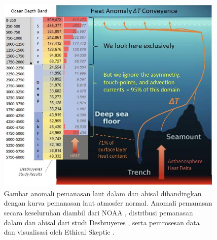 \documentclass[10pt,twocolumn,letterpaper]{article}
\begin{document}
\begin{figure}[t]
\begin{center}
\includegraphics[width=1\textwidth]{deepsea.jpg}
\end{center}
   \caption{Gambar anomali pemanasan laut dalam dan abisal dibandingkan dengan kurva pemanasan laut atmosfer normal. Anomali pemanasan secara keseluruhan diambil dari NOAA \cite{147}, distribusi pemanasan dalam dan abisal dari studi Desbruyeres \cite{132}, serta pemrosesan data dan visualisasi oleh Ethical Skeptic \cite{129}.}
\label{fig:21}
\end{figure}
\end{document}
